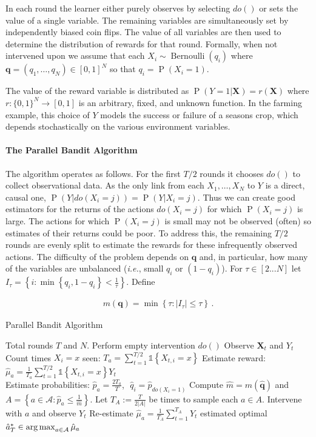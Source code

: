 \documentclass[11pt,a4paper,twoside]{report}
\newcommand{\actions}{\mathcal{A}}
\newcommand{\ie}{\textit{i.e.}}
\newcommand{\set}[1]{\left\{#1\right\}}
\newcommand{\ind}[1]{\mathds{1}\!\!\set{#1}}
\newcommand{\argmax}{\operatornamewithlimits{arg\,max}}
\newcommand{\eq}[1]{\begin{align*}#1\end{align*}}
\renewcommand{\P}[1]{\operatorname{P}\left(#1\right)}
\newcommand{\bernoulli}{\operatorname{Bernoulli}}
\renewcommand{\vec}[1]{\boldsymbol{#1}}
\theoremstyle{plain}
\theoremstyle{definition}
\begin{document}
In each round the learner either purely observes by selecting $do()$ or sets the value of a single variable. The remaining variables are simultaneously set by independently biased coin flips. The value of all variables are then used to determine the distribution of rewards for that round. Formally, when not intervened upon we assume that each $X_i \sim \bernoulli(q_i)$ where $\vec{q} = (q_1, \ldots, q_N) \in [0,1]^N$ so that $q_i = \P{X_i = 1}$.

The value of the reward variable is distributed as $\P{Y = 1|\vec{X}} = r(\vec{X})$ where 
$r : \{0,1\}^N \to [0,1]$ is an arbitrary, fixed, and unknown function. 
In the farming example, this choice of $Y$ models the success or failure of a seasons crop, 
which depends stochastically on the various environment variables.


\paragraph{The Parallel Bandit Algorithm}
The algorithm operates as follows. For the first $T/2$ rounds it chooses $do()$ to collect observational data. As the only link from each $X_1,\ldots,X_N$ to $Y$ is a direct, causal one, $\P{Y|do(X_i=j)}=\P{Y|X_i=j}$. Thus we can create good estimators for the returns of the actions $do(X_i = j)$ for which $\P{X_i = j}$ is large. The actions for which $\P{X_i = j}$ is small may not be observed (often) so  estimates of their returns could be poor. To address this, the remaining $T/2$ rounds are evenly split to estimate the rewards for these infrequently observed actions. The difficulty of the problem depends on $\vec{q}$ and, in particular, how many of the variables are unbalanced (\ie, small $q_i$ or $(1-q_i)$). For $\tau \in [2...N]$ let $I_\tau = \set{ i : \min\set{q_i, 1-q_i} < \frac{1}{\tau}}$. Define

\eq{
\label{eq:m-simple}
m(\vec{q}) = \min \set{ \tau : |I_{\tau}| \leq \tau}\,.
}


\begin{algorithm}[H]
\caption{Parallel Bandit Algorithm}\label{alg:simple}
\begin{algorithmic}[1]
 Total rounds $T$ and $N$.
\STATE Perform empty intervention $do()$
\STATE Observe $\vec{X}_t$ and $Y_t$
\ENDFOR
\FOR{$a = do(X_i = x) \in \actions$}
\STATE Count times $X_i = x$ seen: $T_a = \sum_{t=1}^{T/2} \ind{X_{t,i} = x}$
\STATE Estimate reward: $\hat{\mu}_a = \frac{1}{T_a} \sum_{t=1}^{T/2} \ind{X_{t,i} = x} Y_t$ \\[0.2cm]
\STATE Estimate probabilities: $\hat{p}_a = \frac{2 T_a}{T}$,\,\, $\hat q_i = \hat p_{do(X_i = 1)}$
\ENDFOR
\STATE Compute $\hat{m} = m(\vec{\hat q})$ and $A = \set{a \in \actions \colon \hat{p}_a \leq \frac{1}{\hat m}}$.
\STATE Let $T_A := \frac{T}{2 |A|}$ be times to sample each $a\in A$.
\STATE Intervene with $a$ and observe $Y_t$
\ENDFOR
\STATE Re-estimate $\hat{\mu}_a = \frac{1}{T_A} \sum_{t=1}^{T_A} Y_t$
\ENDFOR
\RETURN estimated optimal $\hat{a}^*_T \in \argmax_{a\in\actions} \hat{\mu}_a$
\end{algorithmic}
\end{algorithm}
\end{document}
